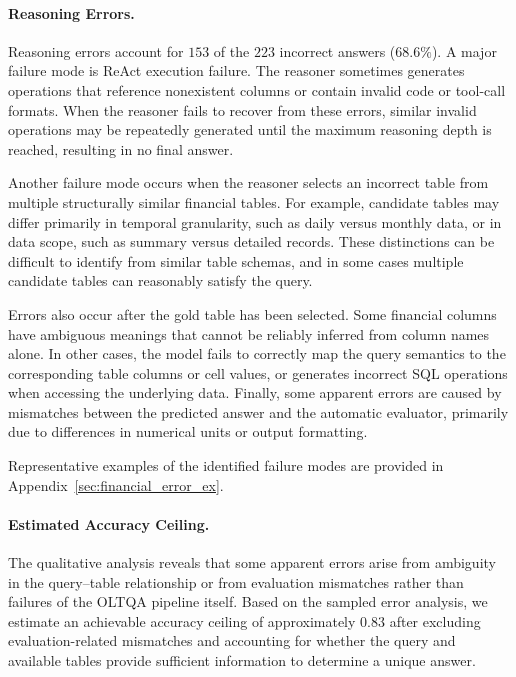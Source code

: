 \paragraph{Reasoning Errors.}
Reasoning errors account for $153$ of the $223$ incorrect answers ($68.6\%$).
A major failure mode is ReAct execution failure.
The reasoner sometimes generates operations that reference nonexistent columns or contain invalid code or tool-call formats.
When the reasoner fails to recover from these errors, similar invalid operations may be repeatedly generated until the maximum reasoning depth is reached, resulting in no final answer.

Another failure mode occurs when the reasoner selects an incorrect table from multiple structurally similar financial tables.
For example, candidate tables may differ primarily in temporal granularity, such as daily versus monthly data, or in data scope, such as summary versus detailed records.
These distinctions can be difficult to identify from similar table schemas, and in some cases multiple candidate tables can reasonably satisfy the query.

Errors also occur after the gold table has been selected.
Some financial columns have ambiguous meanings that cannot be reliably inferred from column names alone.
In other cases, the model fails to correctly map the query semantics to the corresponding table columns or cell values, or generates incorrect SQL operations when accessing the underlying data.
Finally, some apparent errors are caused by mismatches between the predicted answer and the automatic evaluator, primarily due to differences in numerical units or output formatting.

Representative examples of the identified failure modes are provided in Appendix~\ref{sec:financial_error_ex}.

\paragraph{Estimated Accuracy Ceiling.}
The qualitative analysis reveals that some apparent errors arise from ambiguity in the query--table relationship or from evaluation mismatches rather than failures of the OLTQA pipeline itself.
Based on the sampled error analysis, we estimate an achievable accuracy ceiling of approximately $0.83$ after excluding evaluation-related mismatches and accounting for whether the query and available tables provide sufficient information to determine a unique answer.